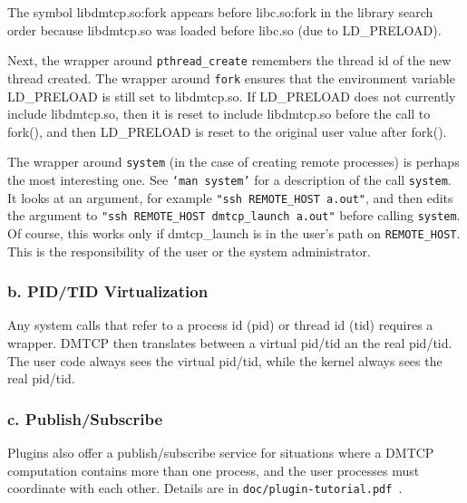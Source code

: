 \documentclass{article}
\begin{document}
The symbol libdmtcp.so:fork appears before libc.so:fork in the
library search order because libdmtcp.so was loaded before libc.so
(due to LD\_PRELOAD).

Next, the wrapper around {\tt pthread\_create} remembers the thread id
of the new thread created.  The wrapper around {\tt fork} ensures
that the environment variable LD\_PRELOAD is still set to libdmtcp.so.
If LD\_PRELOAD does not currently include libdmtcp.so, then it is
reset to include libdmtcp.so before the call to fork(), and then
LD\_PRELOAD is reset to the original user value after fork().

The wrapper around {\tt system} (in the case of creating remote processes)
is perhaps the most interesting one.  See {\tt `man system'} for a description
of the call {\tt system}.  It looks at an argument, for example
{\tt "ssh REMOTE\_HOST a.out"}, and then edits the argument to
{\tt "ssh REMOTE\_HOST dmtcp\_launch a.out"} before calling {\tt system}.
Of course, this works only if dmtcp\_launch is in the user's path
on {\tt REMOTE\_HOST}.  This is the responsibility of the user or the
system administrator.

\subsubsection*{b. PID/TID Virtualization}

Any system calls that refer to a process id (pid) or thread id (tid) requires
a wrapper.  DMTCP then translates between a virtual pid/tid an the
real pid/tid.  The user code always sees the virtual pid/tid, while
the kernel always sees the real pid/tid.

\subsubsection*{c. Publish/Subscribe}

Plugins also offer a publish/subscribe service for situations where
a DMTCP computation contains more than one process, and the user
processes must coordinate with each other.  Details are in
{\tt doc/plugin-tutorial.pdf}~.
\end{document}
